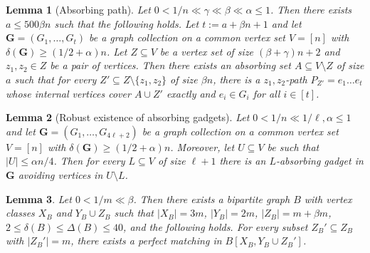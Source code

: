 \documentclass[10pt,a4paper]{amsart}
\newtheorem{lemma}{Lemma}
\newcommand{\dD}{\delta}
\newcommand{\mbf}[1]{\mathbf{#1}}
\begin{document}
\begin{lemma}[Absorbing path] \label{lemma:abspath}
Let $0<1/n \ll \gamma \ll \beta \ll \alpha \leq 1$. Then there exists  $a\le 500\beta n$ such that the following holds. Let   $t:=a+\beta n+1$ and let $\mathbf{G}=(G_1, \ldots, G_t)$  be a graph collection on a common vertex set $V=[n]$ with $\delta(\mathbf{G})\geq (1/2+\alpha)n$. Let $Z \subseteq V$ be a vertex set of size $(\beta +\gamma )n+2$ and $z_1,z_2\in Z$ be a pair of vertices. Then there exists an \emph{absorbing set} $A \subseteq V \setminus Z$ of size $a$ such that for every $Z' \subseteq Z\setminus \{z_1, z_2\}$ of size $\beta n$, there is a $z_1,z_2$-path $P_{Z'}=e_1 \ldots e_t$ whose internal vertices cover $A \cup Z'$ exactly and $e_i\in G_i$ for all $i\in[t]$.
\end{lemma}

\begin{lemma}[Robust existence of absorbing gadgets]\label{lemma:absgag}
Let $0<1/n \ll 1/\ell, \alpha \leq 1$ and let $\mathbf{G}=(G_1, \ldots, G_{4\ell+2})$ be a graph collection on a common vertex set $V=[n]$ with $\delta(\mathbf{G}) \geq (1/2+\alpha)n$. Moreover, let $U \subseteq V$ be such that $|U| \leq \alpha n/4$. Then for every $L \subseteq V$ of size $\ell+1$ there is an $L$-absorbing gadget in $\mbf G$ avoiding vertices in $U\setminus L$. 
\end{lemma}

\begin{lemma}\label{lemma:rmbg}
Let $0 < 1/m \ll \beta$.
Then there exists a bipartite graph $B$ with vertex classes $X_B$ and $Y_B \cup Z_B$ such that $|X_B|=3m$, $|Y_B|=2m$, $|Z_B|=m+ \beta m$, $2 \leq \dD(B) \leq \Delta(B) \leq 40$, and the following holds. For every subset $Z_B'\subseteq Z_B$ with $|Z_B'|=m$, there exists a perfect matching in $B[X_B, Y_B \cup Z_B']$.
\end{lemma}
\end{document}
